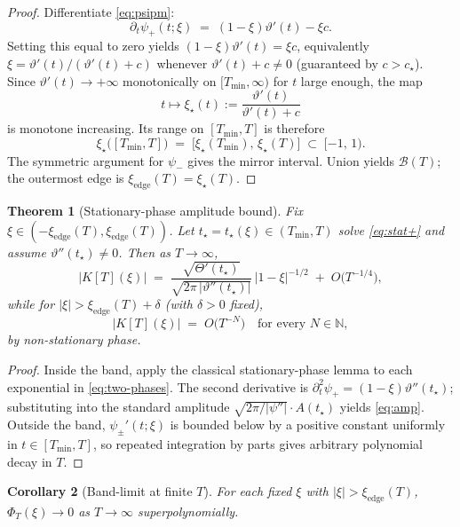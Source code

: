 \documentclass[11pt,a4paper]{article}
\theoremstyle{plain}
\newtheorem{theorem}{Theorem}
\newtheorem{corollary}[theorem]{Corollary}
\theoremstyle{definition}
\newcommand{\N}{\mathbb{N}}
\begin{document}
\begin{proof}
Differentiate \eqref{eq:psipm}:
\[
\partial_t\psi_{+}(t;\xi) \;=\; (1-\xi)\vartheta'(t)-\xi c .
\]
Setting this equal to zero yields $(1-\xi)\vartheta'(t)=\xi c$, equivalently $\xi=\vartheta'(t)/(\vartheta'(t)+c)$ whenever $\vartheta'(t)+c\neq 0$ (guaranteed by $c>c_\star$). Since $\vartheta'(t)\to+\infty$ monotonically on $[T_{\min},\infty)$ for $t$ large enough, the map
\[
t\mapsto \xi_\star(t):=\frac{\vartheta'(t)}{\vartheta'(t)+c}
\]
is monotone increasing. Its range on $[T_{\min},T]$ is therefore
\[
\xi_\star\bigl([T_{\min},T]\bigr) \;=\; \bigl[\xi_\star(T_{\min}),\,\xi_\star(T)\bigr] \;\subset\; [-1,\,1) .
\]
The symmetric argument for $\psi_-$ gives the mirror interval. Union yields $\mathcal{B}(T)$; the outermost edge is $\xi_{\mathrm{edge}}(T)=\xi_\star(T)$.
\end{proof}

\begin{theorem}[Stationary-phase amplitude bound]\label{thm:amp}
Fix $\xi\in(-\xi_{\mathrm{edge}}(T),\xi_{\mathrm{edge}}(T))$. Let $t_\star=t_\star(\xi)\in(T_{\min},T)$ solve \eqref{eq:stat+} and assume $\vartheta''(t_\star)\neq 0$. Then as $T\to\infty$,
\begin{equation}\label{eq:amp}
|K[T](\xi)| \;=\; \frac{\sqrt{\Theta'(t_\star)}}{\sqrt{2\pi\,|\vartheta''(t_\star)|}}\,\bigl|1-\xi\bigr|^{-1/2} \;+\; O\!\bigl(T^{-1/4}\bigr),
\end{equation}
while for $|\xi|>\xi_{\mathrm{edge}}(T)+\delta$ (with $\delta>0$ fixed),
\[
|K[T](\xi)| \;=\; O\!\bigl(T^{-N}\bigr)\quad\text{for every }N\in\N,
\]
by non-stationary phase.
\end{theorem}

\begin{proof}
Inside the band, apply the classical stationary-phase lemma \cite{Stein} to each exponential in \eqref{eq:two-phases}. The second derivative is $\partial_t^2\psi_+ = (1-\xi)\vartheta''(t_\star)$; substituting into the standard amplitude $\sqrt{2\pi/|\psi''|}\cdot A(t_\star)$ yields \eqref{eq:amp}. Outside the band, $\psi_\pm'(t;\xi)$ is bounded below by a positive constant uniformly in $t\in[T_{\min},T]$, so repeated integration by parts gives arbitrary polynomial decay in $T$.
\end{proof}

\begin{corollary}[Band-limit at finite $T$]\label{cor:bandT}
For each fixed $\xi$ with $|\xi|>\xi_{\mathrm{edge}}(T)$, $\Phi_T(\xi)\to 0$ as $T\to\infty$ superpolynomially.
\end{corollary}
\end{document}
